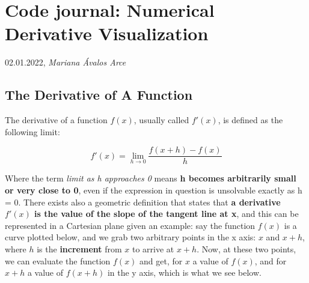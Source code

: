\documentclass[12pt]{article}
\date{}
\begin{document}

 

\section*{\textbf{Code journal: Numerical Derivative Visualization}}

02.01.2022, \textit{Mariana Ávalos Arce}

\subsection*{The Derivative of A Function}

The derivative of a function $f(x)$, usually called $f'(x)$, is defined as the following limit:

\begin{equation}
    f'(x) = \lim_{h\to0} \frac{f(x+h) - f(x)}{h}
\end{equation}

Where the term \textit{limit as h approaches 0} means \textbf{h becomes arbitrarily small or very close to 0}, even if the expression in question is unsolvable exactly as h = 0. There exists also a geometric definition that states that \textbf{a derivative $f'(x)$ is the value of the slope of the tangent line at x}, and this can be represented in a Cartesian plane given an example: say the function $f(x)$ is a curve plotted below, and we grab two arbitrary points in the x axis: $x$ and $x+h$, where $h$ is the \textbf{increment} from $x$ to arrive at $x+h$. Now, at these two points, we can evaluate the function $f(x)$ and get, for $x$ a value of $f(x)$, and for $x+h$ a value of $f(x+h)$ in the y axis, which is what we see below.
\end{document}

